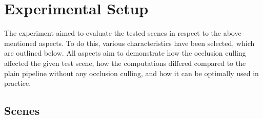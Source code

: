 \section{Experimental Setup} \label{sec-experimental-evaluation}

The experiment aimed to evaluate the tested scenes in respect to the above-mentioned aspects. To do this, 
various characteristics have been selected, which are outlined below. All aspects aim to demonstrate how 
the occlusion culling affected the given test scene, how the computations differed compared to the plain 
pipeline without any occlusion culling, and how it can be optimally used in practice.


\subsection*{Scenes} \label{subsec-models}

